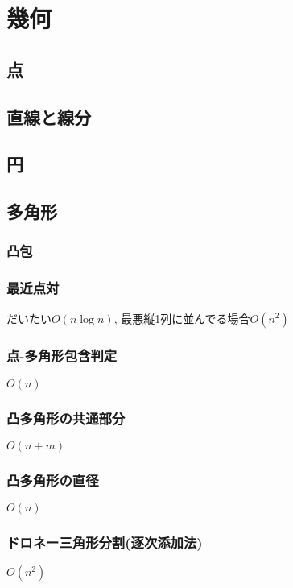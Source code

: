\section{幾何}

\subsection{点}

\subsection{直線と線分}

\subsection{円}

\subsection{多角形}

\subsubsection{凸包}

\subsubsection{最近点対}
だいたい$O(n\log n)$, 最悪縦1列に並んでる場合$O(n^2)$

\subsubsection{点-多角形包含判定}
$O(n)$

\subsubsection{凸多角形の共通部分}
$O(n+m)$

\subsubsection{凸多角形の直径}
$O(n)$

\subsubsection{ドロネー三角形分割(逐次添加法)}
$O(n^2)$

